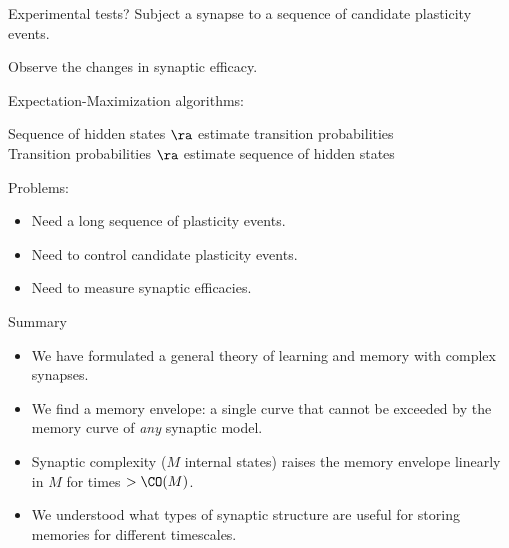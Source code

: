 \documentclass[final,hyperref={pdfpagelabels=false,bookmarks=false}]{beamer}
\begin{document}
\begin{frame}{}
\begin{columns}[t]
\begin{column}{0.33\linewidth}



\begin{block}{Experimental tests?}
%
 Subject a synapse to a sequence of candidate plasticity events.
 
 Observe the changes in synaptic efficacy.
 
 \vp Expectation-Maximization algorithms:
 \parbox[t]{0.5\linewidth}{
   Sequence of hidden states $\ra$ estimate transition probabilities \\
   Transition probabilities $\ra$ estimate sequence of hidden states
 }
 
 \vp Problems:
 \begin{itemize}
   \item Need a long sequence of plasticity events.
   \item Need to control candidate plasticity events.
   \item Need to measure synaptic efficacies.
 \end{itemize}
%
\end{block}


\begin{block}{Summary}
%
  \begin{itemize}
    \item We have formulated a general theory of learning and memory with complex synapses.
    \item We find a memory envelope: a single curve that cannot be exceeded by the memory curve of \emph{any} synaptic model.
    \item    Synaptic complexity ($M$ internal states) raises the memory envelope linearly in $M$ for times $> \CO(M)$.
    \item We understood what types of synaptic structure are useful for storing memories for different timescales.
  \end{itemize}
%
\end{block}


\end{column}
\end{columns}
\end{frame}
\end{document}
